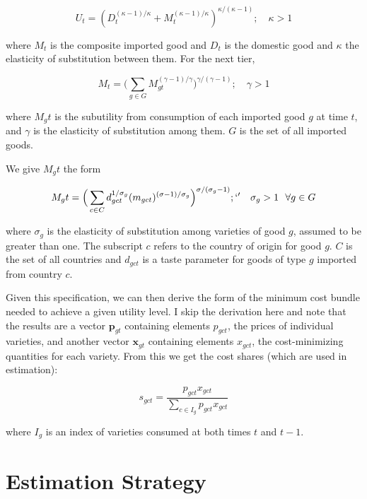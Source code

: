 \documentclass[12pt,a4paper]{article}                      %
\begin{document}
\begin{equation}
    U_t = (D_t^{(\kappa - 1)/\kappa} + M_t^{(\kappa - 1)/\kappa})^{\kappa/(\kappa - 1)}; \quad \kappa > 1
\end{equation}

where $M_t$ is the composite imported good and $D_t$ is the domestic good and $\kappa$ the elasticity of substitution between them.  For the next tier,

\begin{equation}
    M_t = \Big(\sum_{g \in G} M_{gt}^{(\gamma - 1) / \gamma}\Big)^{\gamma/(\gamma - 1)}; \quad \gamma > 1
\end{equation}

where $M_gt$ is the subutility from consumption of each imported good $g$ at time $t$, and $\gamma$ is the elasticity of substitution among them.  $G$ is the set of all imported goods.

We give $M_gt$ the form

\begin{equation}
    M_gt = \Big( \sum_{c \in C} d_{gct}^{1 / \sigma_g}(m_{gct})^{(\sigma - 1) / \sigma_g}  \Big) ^ {\sigma / (\sigma_g - 1)};`' \quad \sigma_g > 1 \ \ \forall g \in G
\end{equation}

where $\sigma_g$ is the elasticity of substitution among varieties of good $g$, assumed to be greater than one.  The subscript $c$ refers to the country of origin for good $g$.  $C$ is the set of all countries and $d_{gct}$ is a taste parameter for goods of type $g$ imported from country $c$.

Given this specification, we can then derive the form of the minimum cost bundle needed to achieve a given utility level.  I skip the derivation here and note that the results are a vector $\mathbf{p}_{gt}$ containing elements $p_{gct}$, the prices of individual varieties, and another vector $\mathbf{x}_{gt}$ containing elements $x_{gct}$, the cost-minimizing quantities for each variety.  From this we get the cost shares (which are used in estimation):

\begin{equation}
    s_{gct} = \frac{p_{gct}x_{gct}}{\sum_{c \in I_g}p_{gct}x_{gct}}
\end{equation}

where $I_g$ is an index of varieties consumed at both times $t$ and $t - 1$.

\section{Estimation Strategy}
\label{sec:econometric_methodology}
\end{document}
